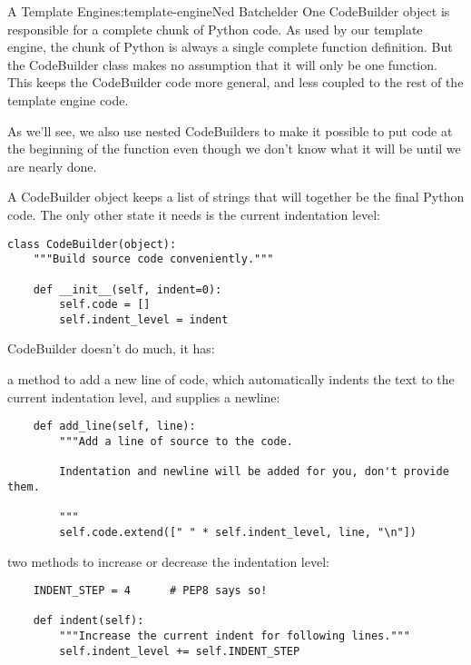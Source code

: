 \begin{aosachapter}{A Template Engine}{s:template-engine}{Ned Batchelder}
One CodeBuilder object is responsible for a complete chunk of Python
code. As used by our template engine, the chunk of Python is always a
single complete function definition. But the CodeBuilder class makes no
assumption that it will only be one function. This keeps the CodeBuilder
code more general, and less coupled to the rest of the template engine
code.

As we'll see, we also use nested CodeBuilders to make it possible to put
code at the beginning of the function even though we don't know what it
will be until we are nearly done.

A CodeBuilder object keeps a list of strings that will together be the
final Python code. The only other state it needs is the current
indentation level:

\begin{verbatim}
class CodeBuilder(object):
    """Build source code conveniently."""

    def __init__(self, indent=0):
        self.code = []
        self.indent_level = indent
\end{verbatim}

CodeBuilder doesn't do much, it has:

\begin{aosaitemize}

\item
  a method to add a new line of code, which automatically indents the
  text to the current indentation level, and supplies a newline:
\end{aosaitemize}

\begin{verbatim}
    def add_line(self, line):
        """Add a line of source to the code.

        Indentation and newline will be added for you, don't provide them.

        """
        self.code.extend([" " * self.indent_level, line, "\n"])
\end{verbatim}

\begin{aosaitemize}

\item
  two methods to increase or decrease the indentation level:
\end{aosaitemize}

\begin{verbatim}
    INDENT_STEP = 4      # PEP8 says so!

    def indent(self):
        """Increase the current indent for following lines."""
        self.indent_level += self.INDENT_STEP


\end{verbatim}
\end{aosachapter}
